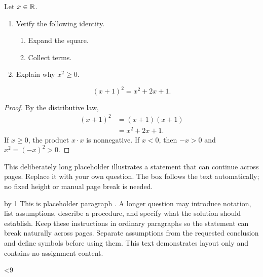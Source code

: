 \documentclass[11pt]{article}
\begin{document}
\begin{problem}\label{prob:example}
Let \(x\in\mathbb{R}\).
\begin{enumerate}
  \item Verify the following identity.
  \begin{enumerate}
    \item Expand the square.
    \item Collect terms.
  \end{enumerate}
  \item Explain why \(x^2\geq 0\).
\end{enumerate}
\[
  (x+1)^2=x^2+2x+1.
\]
\end{problem}

\begin{solution}
\begin{proof}
By the distributive law,
\begin{align}
  (x+1)^2 &= (x+1)(x+1) \\
          &= x^2+2x+1.
\end{align}
If \(x\geq0\), the product \(x\cdot x\) is nonnegative.
If \(x<0\), then \(-x>0\) and \(x^2=(-x)^2>0\).
\end{proof}
\end{solution}

\begin{problem}
This deliberately long placeholder illustrates a statement that can continue
across pages. Replace it with your own question. The box follows the text
automatically; no fixed height or manual page break is needed.

\newcount\exampleparagraph
{}
\loop
  \advance\exampleparagraph by 1
  This is placeholder paragraph \the\exampleparagraph. A longer question may
  introduce notation, list assumptions, describe a procedure, and specify
  what the solution should establish. Keep these instructions in ordinary
  paragraphs so the statement can break naturally across pages. Separate
  assumptions from the requested conclusion and define symbols before using
  them. This text demonstrates layout only and contains no assignment content.
  \par
\ifnum\exampleparagraph<9
\repeat
\end{problem}
\end{document}
